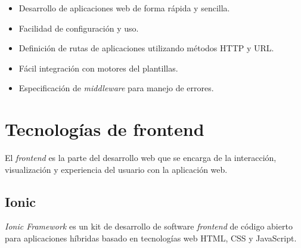 \begin{itemize}
	\item Desarrollo de aplicaciones web de forma rápida y sencilla.
	\item Facilidad de configuración y uso.
	\item Definición de  rutas de aplicaciones utilizando métodos HTTP y URL.
	\item Fácil integración con motores del plantillas.
	\item Especificación de \textit{middleware} para manejo de errores.
\end{itemize}



%
\newpage
\section{Tecnologías de frontend} 

El \textit{frontend} es la parte del desarrollo web que se encarga de la interacción, visualización y experiencia del usuario con la aplicación web.

\subsection{Ionic}
\textit{Ionic Framework }es un kit de desarrollo de software \textit{frontend} de código abierto para aplicaciones híbridas basado en tecnologías web HTML, CSS y JavaScript\citep{ioni1}.

